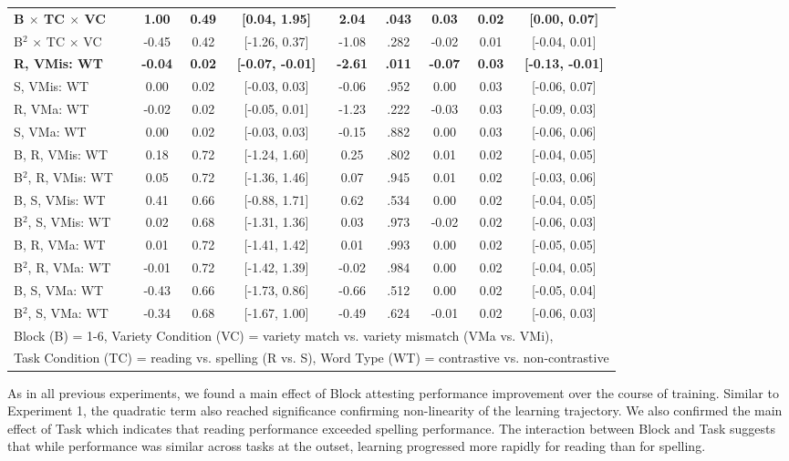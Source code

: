 \documentclass[doc,floatsintext]{apa6}
\begin{document}
\begin{table}[!h]
{\begin{tabular}{lcccccccc}
\textbf{B $\times$ TC $\times$ VC} & \textbf{1.00} & \textbf{0.49} & \textbf{[0.04, 1.95]} & \textbf{2.04} & \textbf{.043} & \textbf{0.03} & \textbf{0.02} & \textbf{[0.00, 0.07]}\\
B$^2$ $\times$ TC $\times$ VC & -0.45 & 0.42 & [-1.26, 0.37] & -1.08 & .282 & -0.02 & 0.01 & [-0.04, 0.01]\\
\textbf{R, VMis: WT} & \textbf{-0.04} & \textbf{0.02} & \textbf{[-0.07, -0.01]} & \textbf{-2.61} & \textbf{.011} & \textbf{-0.07} & \textbf{0.03} & \textbf{[-0.13, -0.01]}\\
S, VMis: WT & 0.00 & 0.02 & [-0.03, 0.03] & -0.06 & .952 & 0.00 & 0.03 & [-0.06, 0.07]\\
R, VMa: WT & -0.02 & 0.02 & [-0.05, 0.01] & -1.23 & .222 & -0.03 & 0.03 & [-0.09, 0.03]\\
S, VMa: WT & 0.00 & 0.02 & [-0.03, 0.03] & -0.15 & .882 & 0.00 & 0.03 & [-0.06, 0.06]\\
B, R, VMis: WT & 0.18 & 0.72 & [-1.24, 1.60] & 0.25 & .802 & 0.01 & 0.02 & [-0.04, 0.05]\\
B$^2$, R, VMis: WT & 0.05 & 0.72 & [-1.36, 1.46] & 0.07 & .945 & 0.01 & 0.02 & [-0.03, 0.06]\\
B, S, VMis: WT & 0.41 & 0.66 & [-0.88, 1.71] & 0.62 & .534 & 0.00 & 0.02 & [-0.04, 0.05]\\
B$^2$, S, VMis: WT & 0.02 & 0.68 & [-1.31, 1.36] & 0.03 & .973 & -0.02 & 0.02 & [-0.06, 0.03]\\
B, R, VMa: WT & 0.01 & 0.72 & [-1.41, 1.42] & 0.01 & .993 & 0.00 & 0.02 & [-0.05, 0.05]\\
B$^2$, R, VMa: WT & -0.01 & 0.72 & [-1.42, 1.39] & -0.02 & .984 & 0.00 & 0.02 & [-0.04, 0.05]\\
B, S, VMa: WT & -0.43 & 0.66 & [-1.73, 0.86] & -0.66 & .512 & 0.00 & 0.02 & [-0.05, 0.04]\\
B$^2$, S, VMa: WT & -0.34 & 0.68 & [-1.67, 1.00] & -0.49 & .624 & -0.01 & 0.02 & [-0.06, 0.03]\\
\bottomrule
\multicolumn{9}{l}{Block (B) = 1-6, Variety Condition (VC) = variety match vs. variety mismatch (VMa vs. VMi),}\\
\multicolumn{9}{l}{Task Condition (TC) = reading vs. spelling (R vs. S), Word Type (WT) = contrastive vs. non-contrastive}\\
\end{tabular}}
\end{table}

As in all previous experiments, we found a main effect of Block
attesting performance improvement over the course of training. Similar
to Experiment 1, the quadratic term also reached significance confirming
non-linearity of the learning trajectory. We also confirmed the main
effect of Task which indicates that reading performance exceeded
spelling performance. The interaction between Block and Task suggests
that while performance was similar across tasks at the outset, learning
progressed more rapidly for reading than for spelling.
\end{document}
